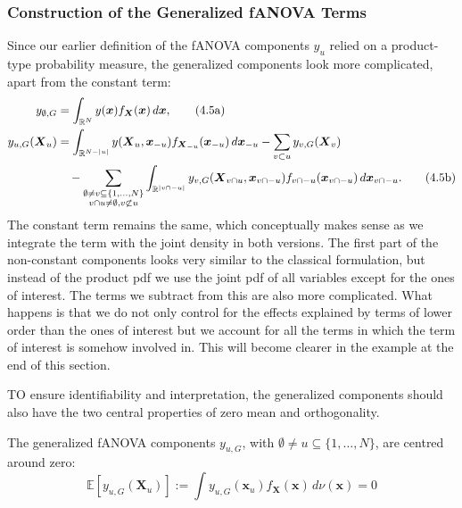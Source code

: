 \subsubsection*{Construction of the Generalized fANOVA Terms}
Since our earlier definition of the fANOVA components $y_u$ relied on a product-type probability measure, the generalized components look more complicated, apart from the constant term:
\begin{align}
y_{\emptyset, G} &= \int_{\mathbb{R}^N} y(\boldsymbol{x}) f_{\boldsymbol{X}}(\boldsymbol{x}) \, d\boldsymbol{x}, \tag{4.5a} \\
y_{u,G}(\boldsymbol{X}_u) &= \int_{\mathbb{R}^{N - |u|}} y(\boldsymbol{X}_u, \boldsymbol{x}_{-u}) f_{\boldsymbol{X}_{-u}}(\boldsymbol{x}_{-u}) \, d\boldsymbol{x}_{-u}
- \sum_{v \subset u} y_{v,G}(\boldsymbol{X}_v) \notag \\
&\quad - \sum_{\substack{\emptyset \neq v \subseteq \{1, \ldots, N\} \\ v \cap u \neq \emptyset, v \not\subset u}}
\int_{\mathbb{R}^{|v \cap -u|}} y_{v,G}(\boldsymbol{X}_{v \cap u}, \boldsymbol{x}_{v \cap -u}) 
f_{v \cap -u}(\boldsymbol{x}_{v \cap -u}) \, d\boldsymbol{x}_{v \cap -u}. \tag{4.5b}
\end{align}
The constant term remains the same, which conceptually makes sense as we integrate the term with the joint density in both versions.  The first part of the non-constant components looks very similar to the classical formulation, but instead of the product pdf we use the joint pdf of all variables except for the ones of interest. The terms we subtract from this are also more complicated. What happens is that we do not only control for the effects explained by terms of lower order than the ones of interest but we account for all the terms in which the term of interest is somehow involved in. This will become clearer in the example at the end of this section.\par

TO ensure identifiability and interpretation, the generalized components should also have the two central properties of zero mean and orthogonality. 
\begin{proposition}
    The generalized fANOVA components $y_{u, G}$, with $\emptyset \neq u \subseteq \{1, \ldots, N\}$, are centred around zero:
\begin{equation}
    \mathbb{E}[y_{u, G}(\boldsymbol{X}_u)] := \int y_{u, G}(\boldsymbol{x}_u) f_{\boldsymbol{X}}(\boldsymbol{x}) \, d\nu (\boldsymbol{x}) = 0
    \label{eq:zero_mean_g}
\end{equation}
\end{proposition}

